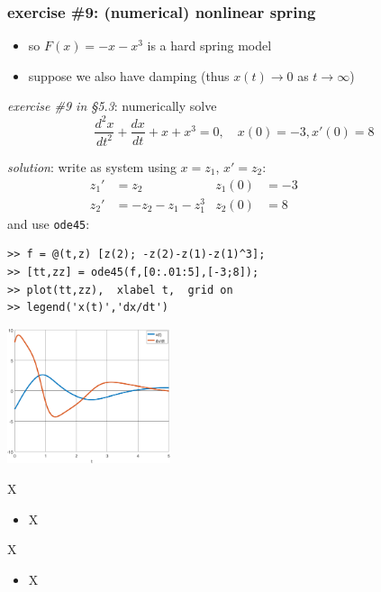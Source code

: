 \documentclass[urlcolor=blue,dvipsnames]{beamer}
\begin{document}
\begin{frame}[fragile]
\frametitle{exercise \#9: (numerical) nonlinear spring}

\begin{itemize}
\item so $F(x)=-x-x^3$ is a hard spring model
\item suppose we also have damping (thus $x(t)\to 0$ as $t\to \infty$)
\end{itemize}

\noindent \emph{exercise \#9 in \S5.3}:  numerically solve
    $$\frac{d^2 x}{dt^2} + \frac{dx}{dt} + x + x^3 = 0, \quad x(0)=-3, x'(0)=8$$

\noindent \emph{solution}:  write as system using $x=z_1$, $x'=z_2$:
\begin{align*}
z_1' &= z_2  & z_1(0)&=-3  &&&&&&&&\\
z_2' &= -z_2 - z_1 - z_1^3 & z_2(0)&=8 &&&&&&&&
\end{align*}
and use \texttt{ode45}:
\begin{Verbatim}[fontsize=\footnotesize]
>> f = @(t,z) [z(2); -z(2)-z(1)-z(1)^3];
>> [tt,zz] = ode45(f,[0:.01:5],[-3;8]);
>> plot(tt,zz),  xlabel t,  grid on
>> legend('x(t)','dx/dt')
\end{Verbatim}

\vspace{-25mm}

\hfill \includegraphics[width=0.36\textwidth]{figs/hardspringsoln}
\end{frame}


\begin{frame}{X}

\begin{itemize}
\item X
\end{itemize}
\end{frame}


\begin{frame}{X}

\begin{itemize}
\item X
\end{itemize}
\end{frame}
\end{document}
